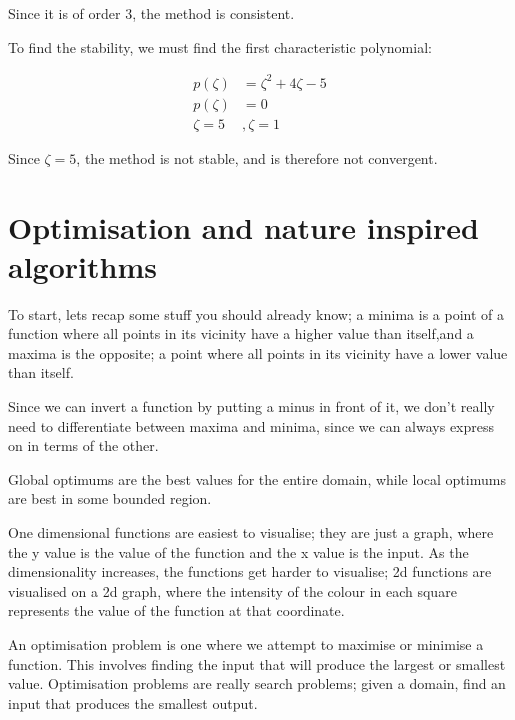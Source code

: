 \begin{description}
Since it is of order $3$, the method is consistent.

To find the stability, we must find the first characteristic
polynomial:

\[
\begin{split}
  p(\zeta) &= \zeta^2 + 4\zeta - 5\\
  p(\zeta) &= 0\\
  \zeta = 5&, \zeta = 1
\end{split}
\]

Since $\zeta = 5$, the method is not stable, and is therefore not
convergent.

\end{description}



\section{Optimisation and nature inspired algorithms}

To start, lets recap some stuff you should already know; a minima is a
point of a function where all points in its vicinity have a higher
value than itself,and a maxima is the opposite; a point where all
points in its vicinity have a lower value than itself.

Since we can invert a function by putting a minus in front of it, we don't
really need to differentiate between maxima and minima, since we can always
express on in terms of the other.

Global optimums are the best values for the entire domain, while local optimums
are best in some bounded region.

One dimensional functions are easiest to visualise; they are just a graph, where
the y value is the value of the function and the x value is the input. As the
dimensionality increases, the functions get harder to visualise; 2d functions
are visualised on a 2d graph, where the intensity of the colour in each square
represents the value of the function at that coordinate. 


An optimisation problem is one where we attempt to maximise or minimise a
function. This involves finding the input that will produce the largest or
smallest value. Optimisation problems are really search problems; given a
domain, find an input that produces the smallest output.

